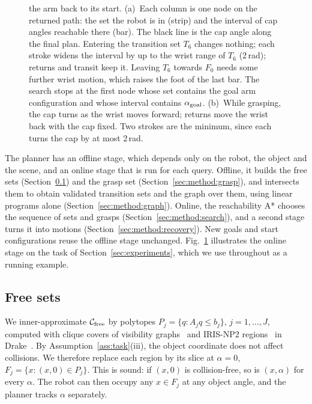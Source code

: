 \begin{figure}[t]
{the arm back to its start.
(a)~Each column is one node on the returned path: the set the robot is in
(strip) and the interval of cap angles reachable there (bar). The black line
is the cap angle along the final plan. Entering the transition set $T_6$
changes nothing; each stroke widens the interval by up to the wrist range of
$T_6$ (2\,rad); returns and transit keep it. Leaving $T_6$ towards $F_0$ needs
some further wrist motion, which raises the foot of the last bar. The search
stops at the first node whose set contains the goal arm configuration and
whose interval contains $\alpha_{\mathrm{goal}}$. (b)~While grasping, the cap turns as the
wrist moves forward; returns move the wrist back with the cap fixed. Two
strokes are the minimum, since each turns the cap by at most 2\,rad.
}
\label{fig:reach}
\end{figure}

The planner has an offline stage, which depends only on the robot, the object
and the scene, and an online stage that is run for each query. Offline, it
builds the free sets (Section~\ref{sec:method:free}) and the grasp set
(Section~\ref{sec:method:grasp}), and intersects them to obtain validated
transition sets and the graph over them, using linear programs alone
(Section~\ref{sec:method:graph}). Online, the reachability A* chooses the
sequence of sets and grasps (Section~\ref{sec:method:search}), and a second
stage turns it into motions (Section~\ref{sec:method:recovery}).
New goals and start configurations reuse the offline stage unchanged.
Fig.~\ref{fig:reach} illustrates the online stage on the task of
Section~\ref{sec:experiments}, which we use throughout as a running example.

\subsection{Free sets}
\label{sec:method:free}
We inner-approximate $\mathcal{C}_{\mathrm{free}}$ by polytopes $P_j=\{q:A_jq\le b_j\}$,
$j=1,\dots,J$, computed with clique covers of visibility
graphs~\cite{werner2024approximating} and IRIS-NP2
regions~\cite{werner2024faster} in Drake~\cite{tedrake2019drake}. By
Assumption~\ref{ass:task}(iii), the object coordinate does not affect
collisions. We therefore replace each region by its slice at $\alpha=0$,
$F_j=\{x:(x,0)\in P_j\}$. This is sound: if $(x,0)$ is collision-free, so is
$(x,\alpha)$ for every $\alpha$. The robot can then occupy any $x\in F_j$ at
any object angle, and the planner tracks $\alpha$ separately.


